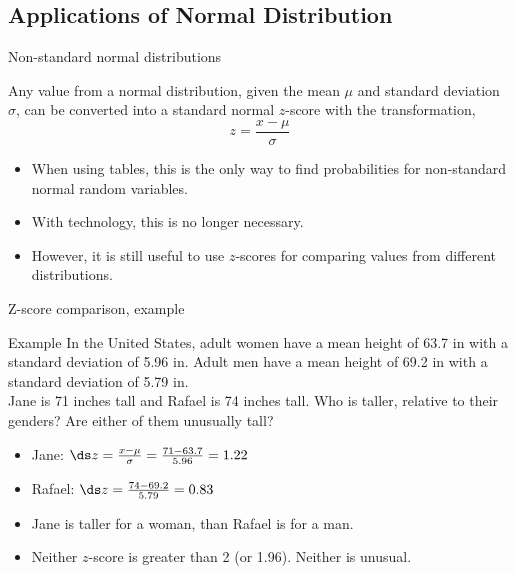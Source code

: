 \documentclass[xcolor=table, handout]{beamer}
\begin{document}
\subsection{Applications of  Normal Distribution}

\begin{frame}{Non-standard normal distributions}
\begin{block}{}
Any value from a normal distribution, given the mean $\mu$ and standard deviation $\sigma$, can be converted into a standard normal $z$-score with the transformation,
\[z = \frac {x - \mu}{\sigma}\]
\begin{itemize}
\pause\item When using tables, this is the only way to find probabilities for non-standard normal random variables.
\pause\item With technology, this is no longer necessary.
\pause\item However, it is still useful to use $z$-scores for comparing values from different distributions.
\end{itemize}
\end{block}
\end{frame}

\begin{frame}{Z-score comparison, example}
\begin{exampleblock}{Example}
In the United States, adult women have a mean height of 63.7 in with a standard deviation of 5.96 in. Adult men have a mean height of 69.2 in with a standard deviation of 5.79 in.\\
\medskip
Jane is 71 inches tall and Rafael is 74 inches tall. Who is taller, relative to their genders? Are either of them unusually tall?
\begin{itemize}
\pause\item Jane: $\ds z = \frac {x - \mu}{\sigma} = \frac {71 - 63.7}{5.96} = 1.22$
\pause\item Rafael: $\ds z = \frac {74 - 69.2}{5.79} = 0.83$
\pause\item Jane is taller for a woman, than Rafael is for a man.
\pause\item Neither $z$-score is greater than 2 (or 1.96). Neither is unusual.
\end{itemize}
\end{exampleblock}
\end{frame}
\end{document}
